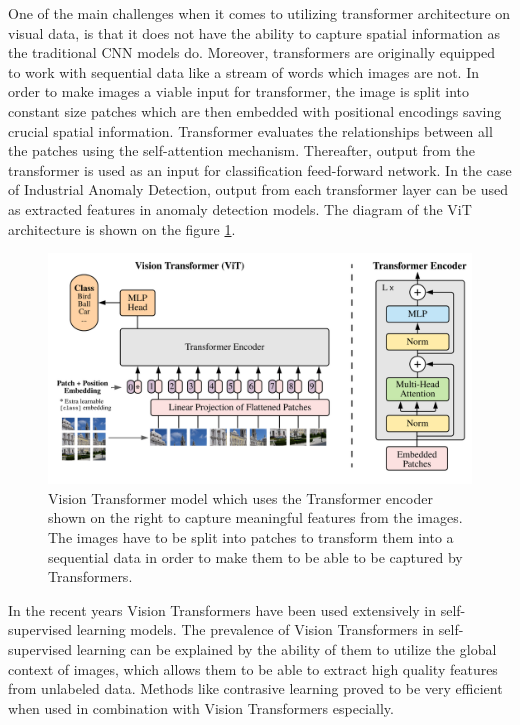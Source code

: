 One of the main challenges when it comes to utilizing transformer architecture on visual data, is that it does not have the ability to capture spatial information as the traditional CNN models do. Moreover, transformers are originally equipped to work with sequential data like a stream of words which images are not. In order to make images a viable input for transformer, the image is split into constant size patches which are then embedded with positional encodings saving crucial spatial information. Transformer evaluates the relationships between all the patches using the self-attention mechanism. Thereafter, output from the transformer is used as an input for classification feed-forward network. In the case of Industrial Anomaly Detection, output from each transformer layer can be used as extracted features in anomaly detection models. The diagram of the ViT architecture is shown on the figure \ref{fig:vit}.

\begin{figure}[h]
	\begin{center}
		\includegraphics[width=0.8\linewidth]{Chapter_2/vit.png}
	\end{center}
	\caption{Vision Transformer model which uses the Transformer encoder shown on the right to capture meaningful features from the images. The images have to be split into patches to transform them into a sequential data in order to make them to be able to be captured by Transformers.}
	\label{fig:vit}
\end{figure}

In the recent years Vision Transformers have been used extensively in self-supervised learning models. The prevalence of Vision Transformers in self-supervised learning can be explained by the ability of them to utilize the global context of images, which allows them to be able to extract high quality features from unlabeled data. Methods like contrasive learning proved to be very efficient when used in combination with Vision Transformers especially.


